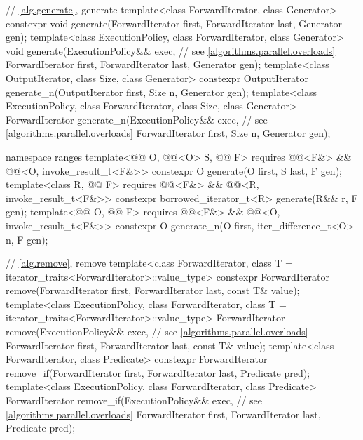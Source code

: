 \begin{codeblock}
{  // \ref{alg.generate}, generate
  template<class ForwardIterator, class Generator>
    constexpr void generate(ForwardIterator first, ForwardIterator last,
                            Generator gen);
  template<class ExecutionPolicy, class ForwardIterator, class Generator>
    void generate(ExecutionPolicy&& exec,                       // see \ref{algorithms.parallel.overloads}
                  ForwardIterator first, ForwardIterator last,
                  Generator gen);
  template<class OutputIterator, class Size, class Generator>
    constexpr OutputIterator generate_n(OutputIterator first, Size n, Generator gen);
  template<class ExecutionPolicy, class ForwardIterator, class Size, class Generator>
    ForwardIterator generate_n(ExecutionPolicy&& exec,          // see \ref{algorithms.parallel.overloads}
                               ForwardIterator first, Size n, Generator gen);

  namespace ranges {
    template<@@ O, @@<O> S, @@ F>
      requires @@<F&> && @@<O, invoke_result_t<F&>>
      constexpr O generate(O first, S last, F gen);
    template<class R, @@ F>
      requires @@<F&> && @@<R, invoke_result_t<F&>>
      constexpr borrowed_iterator_t<R> generate(R&& r, F gen);
    template<@@ O, @@ F>
      requires @@<F&> && @@<O, invoke_result_t<F&>>
      constexpr O generate_n(O first, iter_difference_t<O> n, F gen);
  }

  // \ref{alg.remove}, remove
  template<class ForwardIterator, class T = iterator_traits<ForwardIterator>::value_type>
    constexpr ForwardIterator remove(ForwardIterator first, ForwardIterator last,
                                     const T& value);
  template<class ExecutionPolicy, class ForwardIterator,
           class T = iterator_traits<ForwardIterator>::value_type>
    ForwardIterator remove(ExecutionPolicy&& exec,              // see \ref{algorithms.parallel.overloads}
                           ForwardIterator first, ForwardIterator last,
                           const T& value);
  template<class ForwardIterator, class Predicate>
    constexpr ForwardIterator remove_if(ForwardIterator first, ForwardIterator last,
                                        Predicate pred);
  template<class ExecutionPolicy, class ForwardIterator, class Predicate>
    ForwardIterator remove_if(ExecutionPolicy&& exec,           // see \ref{algorithms.parallel.overloads}
                              ForwardIterator first, ForwardIterator last,
                              Predicate pred);

}
\end{codeblock}

